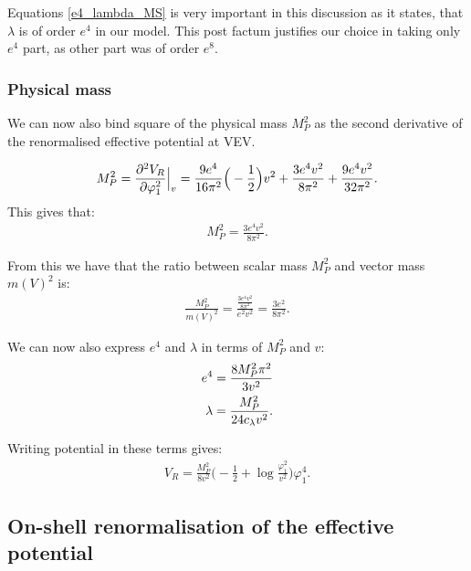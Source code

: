 Equations \ref{e4_lambda_MS} is very important in this discussion as it states, that $\lambda$ 
is of order $e^4$ in our model. This post factum justifies our 
choice in taking only $e^4$ part, as other part was of order $e^8$. \\

\subsubsection{Physical mass}\label{MSbar physical mass}
We can now also bind square of the physical mass $M_P^2$ as the second derivative of the 
renormalised effective potential at VEV.

\begin{align}
M_P^2 = \frac{\partial^2 V_R}{\partial \varphi_1^2} \Big|_v = \frac{9e^4}{16\pi^2}\Big(-\frac{1}{2}\Big)v^2+\frac{3e^4v^2}{8\pi^2} 
+\frac{9e^4v^2}{32\pi^2}.
\end{align}
This gives that:
\begin{align}
M_P^2 = \frac{3e^4v^2}{8\pi^2}.
\end{align}

From this we have that the ratio between scalar mass $M_P^2$ and vector mass $m(V)^2$ is:
\begin{align}
\frac{M_P^2}{m(V)^2} = \frac{\frac{3e^4v^2}{8\pi^2}}{e^2v^2} = \frac{3e^2}{8\pi^2}.
\end{align}

We can now also express $e^4$ and $\lambda$ in terms of $M_P^2$ and $v$:
\begin{align}
e^4 = \frac{8M_P^2\pi^2}{3v^2} \\
\lambda = \frac{M_P^2}{24c_\lambda v^2}.
\end{align}

Writing potential in these terms gives:
\begin{align}
V_R = \frac{M_P^2}{8v^2}\Big(-\frac{1}{2}+\log\frac{\varphi_1^2}{v^2}\Big)\varphi_1^4.
\end{align}


\subsection{On-shell renormalisation of the effective potential}















